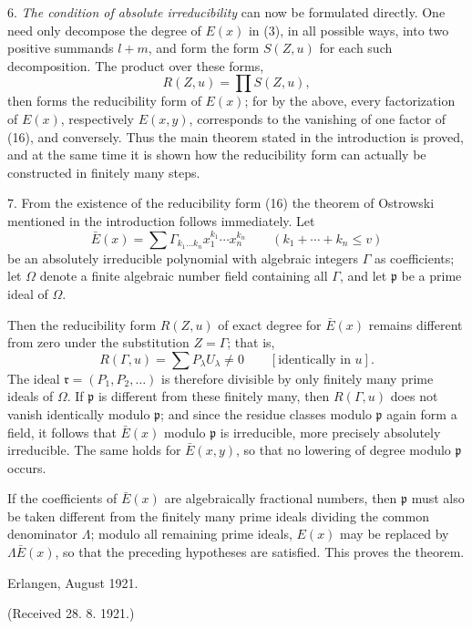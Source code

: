 \documentclass[11pt]{article}
\begin{document}
6. \emph{The condition of absolute irreducibility} can now be formulated directly. One need only decompose the degree of $E(x)$ in (3), in all possible ways, into two positive summands $l+m$, and form the form $S(Z,u)$ for each such decomposition. The product over these forms,
\begin{equation}
 R(Z,u)=\prod S(Z,u),
\tag{16}
\end{equation}
then forms the reducibility form of $E(x)$; for by the above, every factorization of $E(x)$, respectively $E(x,y)$, corresponds to the vanishing of one factor of (16), and conversely. Thus the main theorem stated in the introduction is proved, and at the same time it is shown how the reducibility form can actually be constructed in finitely many steps.

7. From the existence of the reducibility form (16) the theorem of Ostrowski mentioned in the introduction follows immediately. Let
\[
 \bar E(x)=\sum \Gamma_{k_1\ldots k_n}x_1^{k_1}\cdots x_n^{k_n}
 \qquad(k_1+\cdots+k_n\le v)
\]
be an absolutely irreducible polynomial with algebraic integers $\Gamma$ as coefficients; let $\Omega$ denote a finite algebraic number field containing all $\Gamma$, and let $\mathfrak p$ be a prime ideal of $\Omega$.

Then the reducibility form $R(Z,u)$ of exact degree for $\bar E(x)$ remains different from zero under the substitution $Z=\Gamma$; that is,
\[
 R(\Gamma,u)=\sum P_\lambda U_\lambda\ne0\qquad[\text{identically in }u].
\]
The ideal $\mathfrak r=(P_1,P_2,\ldots)$ is therefore divisible by only finitely many prime ideals of $\Omega$. If $\mathfrak p$ is different from these finitely many, then $R(\Gamma,u)$ does not vanish identically modulo $\mathfrak p$; and since the residue classes modulo $\mathfrak p$ again form a field, it follows that $\bar E(x)$ modulo $\mathfrak p$ is irreducible, more precisely absolutely irreducible. The same holds for $\bar E(x,y)$, so that no lowering of degree modulo $\mathfrak p$ occurs.

If the coefficients of $\bar E(x)$ are algebraically fractional numbers, then $\mathfrak p$ must also be taken different from the finitely many prime ideals dividing the common denominator $\Lambda$; modulo all remaining prime ideals, $E(x)$ may be replaced by $\Lambda\bar E(x)$, so that the preceding hypotheses are satisfied. This proves the theorem.

\begin{flushleft}
Erlangen, August 1921.
\end{flushleft}
\begin{center}
(Received 28. 8. 1921.)
\end{center}
\end{document}
